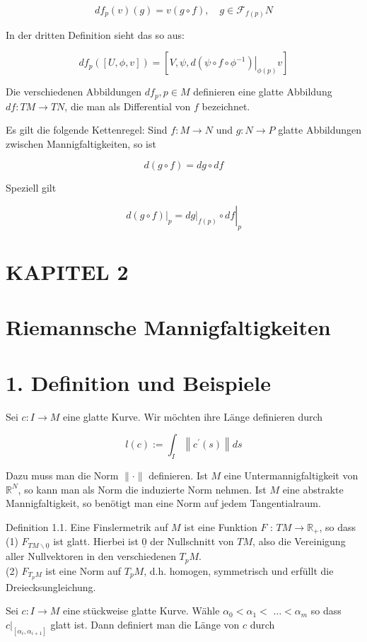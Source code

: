 \documentclass[10pt]{article}
\begin{document}
$$
d f_{p}(v)(g)=v(g \circ f), \quad g \in \mathcal{F}_{f(p)} N
$$

In der dritten Definition sieht das so aus:

$$
d f_{p}([U, \phi, v])=\left[V, \psi,\left.d\left(\psi \circ f \circ \phi^{-1}\right)\right|_{\phi(p)} v\right]
$$

Die verschiedenen Abbildungen $d f_{p}, p \in M$ definieren eine glatte Abbildung $d f: T M \rightarrow T N$, die man als Differential von $f$ bezeichnet.

Es gilt die folgende Kettenregel: Sind $f: M \rightarrow N$ und $g: N \rightarrow P$ glatte Abbildungen zwischen Mannigfaltigkeiten, so ist

$$
d(g \circ f)=d g \circ d f
$$

Speziell gilt

$$
\left.d(g \circ f)\right|_{p}=\left.\left.d g\right|_{f(p)} \circ d f\right|_{p}
$$

\section*{KAPITEL 2}
\section*{Riemannsche Mannigfaltigkeiten}
\section*{1. Definition und Beispiele}
Sei $c: I \rightarrow M$ eine glatte Kurve. Wir möchten ihre Länge definieren durch

$$
l(c):=\int_{I}\left\|c^{\prime}(s)\right\| d s
$$

Dazu muss man die Norm $\|\cdot\|$ definieren. Ist $M$ eine Untermannigfaltigkeit von $\mathbb{R}^{N}$, so kann man als Norm die induzierte Norm nehmen. Ist $M$ eine abstrakte Mannigfaltigkeit, so benötigt man eine Norm auf jedem Tangentialraum.

Definition 1.1. Eine Finslermetrik auf $M$ ist eine Funktion $F$ : $T M \rightarrow \mathbb{R}_{+}$, so dass\\
(1) $F_{T M \backslash \underline{0}}$ ist glatt. Hierbei ist $\underline{0}$ der Nullschnitt von $T M$, also die Vereinigung aller Nullvektoren in den verschiedenen $T_{p} M$.\\
(2) $F_{T_{p} M}$ ist eine Norm auf $T_{p} M$, d.h. homogen, symmetrisch und erfüllt die Dreiecksungleichung.

Sei $c: I \rightarrow M$ eine stückweise glatte Kurve. Wähle $\alpha_{0}<\alpha_{1}<$ $\ldots<\alpha_{m}$ so dass $\left.c\right|_{\left[\alpha_{i}, \alpha_{i+1}\right]}$ glatt ist. Dann definiert man die Länge von $c$ durch
\end{document}

